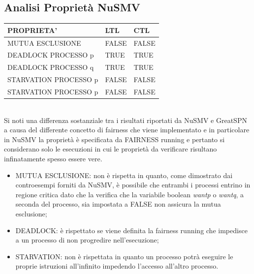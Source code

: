 \documentclass{article}
\begin{document}
\subsection{Analisi Proprietà NuSMV}
\begin{tabular}{|p{6cm}||p{3cm}|p{3cm}|}
\hline
PROPRIETA' & LTL & CTL\\
\hline
 MUTUA ESCLUSIONE&FALSE&FALSE \\
 DEADLOCK PROCESSO p&TRUE&TRUE\\
 DEADLOCK PROCESSO q&TRUE&TRUE \\
 STARVATION PROCESSO p&FALSE&FALSE\\
 STARVATION PROCESSO p&FALSE&FALSE\\
\hline
\end{tabular}
\\
Si noti una differenza sostanziale tra i risultati riportati da NuSMV e GreatSPN a causa del differente concetto di fairness che viene implementato e in particolare in NuSMV la proprietà è specificata da FAIRNESS running e pertanto si considerano solo le esecuzioni in cui le proprietà da verificare risultano infinatamente spesso essere vere.
\begin{itemize}
    \item MUTUA ESCLUSIONE: non è rispetta in quanto, come dimostrato dai controesempi forniti da NuSMV, è possibile che entrambi i processi entrino in regione critica dato che la verifica che la variabile boolean \textit{wantp} o \textit{wantq}, a seconda del processo, sia impostata a FALSE non assicura la mutua esclusione;
    \item DEADLOCK: è rispettato se viene definita la fairness running che impedisce a un processo di non progredire nell'esecuzione;
    \item STARVATION: non è rispettata in quanto un processo potrà eseguire le proprie istruzioni all'infinito impedendo l'accesso all'altro processo.
\end{itemize}
\end{document}
